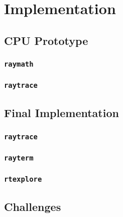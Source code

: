 %
%
%
\chapter{Implementation}\label{ch:implementation}

\section{CPU Prototype}\label{ch:implementation:rayterm-cpu}

\subsection{\texttt{raymath}}\label{ch:implementation:rayterm-cpu:raymath}

\subsection{\texttt{raytrace}}\label{ch:implementation:rayterm-cpu:raytrace}


\section{Final Implementation}\label{ch:implementation:rayterm-gpu}

\subsection{\texttt{raytrace}}\label{ch:implementation:rayterm-gpu:raytrace}

\subsection{\texttt{rayterm}}\label{ch:implementation:rayterm-gpu:rayterm}

\subsection{\texttt{rtexplore}}\label{ch:implementation:rayterm-gpu:rtexplore}

\section{Challenges}

